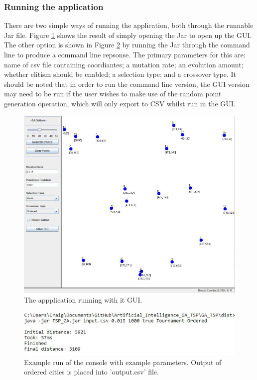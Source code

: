 \documentclass[article]{IEEEtran}
\begin{document}
\subsubsection{Running the application}
There are two simple ways of running the application, both through the runnable Jar file. Figure \ref{fig:6} shows the result of simply opening the Jar to open up the GUI. The other option is shown in Figure \ref{fig:7} by running the Jar through the command line to produce a command line repsonse. The primary parameters for this are: name of csv file containing coordiantes; a mutation rate; an evolution amount; whether elitism should be enabled; a selection type; and a crossover type. It should be noted that in order to run the command line version, the GUI version may need to be run if the user wishes to make use of the random point generation operation, which will only export to CSV whilst run in the GUI.

\begin{figure}[H]
\centering
  \includegraphics[width=.8\linewidth]{images/GUI}
  \caption{The appplication running with it GUI.}
  \label{fig:6}
\end{figure}

\begin{figure}[H]
\centering
  \includegraphics[width=.9\linewidth]{images/commandLine}
  \caption{Example run of the console with example parameters. Output of ordered cities is placed into 'output.csv' file.}
  \label{fig:7}
\end{figure}
\end{document}
